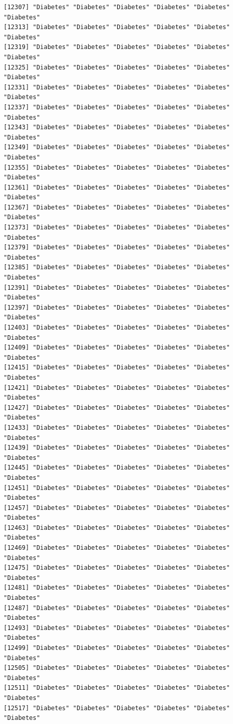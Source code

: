 \documentclass[
  letterpaper,
  DIV=11,
  numbers=noendperiod]{scrartcl}
\begin{document}
\begin{verbatim}
[12307] "Diabetes" "Diabetes" "Diabetes" "Diabetes" "Diabetes" "Diabetes"
[12313] "Diabetes" "Diabetes" "Diabetes" "Diabetes" "Diabetes" "Diabetes"
[12319] "Diabetes" "Diabetes" "Diabetes" "Diabetes" "Diabetes" "Diabetes"
[12325] "Diabetes" "Diabetes" "Diabetes" "Diabetes" "Diabetes" "Diabetes"
[12331] "Diabetes" "Diabetes" "Diabetes" "Diabetes" "Diabetes" "Diabetes"
[12337] "Diabetes" "Diabetes" "Diabetes" "Diabetes" "Diabetes" "Diabetes"
[12343] "Diabetes" "Diabetes" "Diabetes" "Diabetes" "Diabetes" "Diabetes"
[12349] "Diabetes" "Diabetes" "Diabetes" "Diabetes" "Diabetes" "Diabetes"
[12355] "Diabetes" "Diabetes" "Diabetes" "Diabetes" "Diabetes" "Diabetes"
[12361] "Diabetes" "Diabetes" "Diabetes" "Diabetes" "Diabetes" "Diabetes"
[12367] "Diabetes" "Diabetes" "Diabetes" "Diabetes" "Diabetes" "Diabetes"
[12373] "Diabetes" "Diabetes" "Diabetes" "Diabetes" "Diabetes" "Diabetes"
[12379] "Diabetes" "Diabetes" "Diabetes" "Diabetes" "Diabetes" "Diabetes"
[12385] "Diabetes" "Diabetes" "Diabetes" "Diabetes" "Diabetes" "Diabetes"
[12391] "Diabetes" "Diabetes" "Diabetes" "Diabetes" "Diabetes" "Diabetes"
[12397] "Diabetes" "Diabetes" "Diabetes" "Diabetes" "Diabetes" "Diabetes"
[12403] "Diabetes" "Diabetes" "Diabetes" "Diabetes" "Diabetes" "Diabetes"
[12409] "Diabetes" "Diabetes" "Diabetes" "Diabetes" "Diabetes" "Diabetes"
[12415] "Diabetes" "Diabetes" "Diabetes" "Diabetes" "Diabetes" "Diabetes"
[12421] "Diabetes" "Diabetes" "Diabetes" "Diabetes" "Diabetes" "Diabetes"
[12427] "Diabetes" "Diabetes" "Diabetes" "Diabetes" "Diabetes" "Diabetes"
[12433] "Diabetes" "Diabetes" "Diabetes" "Diabetes" "Diabetes" "Diabetes"
[12439] "Diabetes" "Diabetes" "Diabetes" "Diabetes" "Diabetes" "Diabetes"
[12445] "Diabetes" "Diabetes" "Diabetes" "Diabetes" "Diabetes" "Diabetes"
[12451] "Diabetes" "Diabetes" "Diabetes" "Diabetes" "Diabetes" "Diabetes"
[12457] "Diabetes" "Diabetes" "Diabetes" "Diabetes" "Diabetes" "Diabetes"
[12463] "Diabetes" "Diabetes" "Diabetes" "Diabetes" "Diabetes" "Diabetes"
[12469] "Diabetes" "Diabetes" "Diabetes" "Diabetes" "Diabetes" "Diabetes"
[12475] "Diabetes" "Diabetes" "Diabetes" "Diabetes" "Diabetes" "Diabetes"
[12481] "Diabetes" "Diabetes" "Diabetes" "Diabetes" "Diabetes" "Diabetes"
[12487] "Diabetes" "Diabetes" "Diabetes" "Diabetes" "Diabetes" "Diabetes"
[12493] "Diabetes" "Diabetes" "Diabetes" "Diabetes" "Diabetes" "Diabetes"
[12499] "Diabetes" "Diabetes" "Diabetes" "Diabetes" "Diabetes" "Diabetes"
[12505] "Diabetes" "Diabetes" "Diabetes" "Diabetes" "Diabetes" "Diabetes"
[12511] "Diabetes" "Diabetes" "Diabetes" "Diabetes" "Diabetes" "Diabetes"
[12517] "Diabetes" "Diabetes" "Diabetes" "Diabetes" "Diabetes" "Diabetes"

\end{verbatim}
\end{document}
